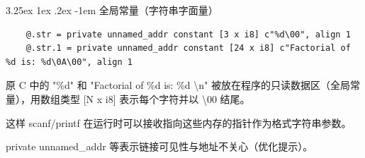 \documentclass[a4paper]{article}
\makeatletter
\renewcommand\paragraph{\@startsection{paragraph}{5}{\z@}%
	{3.25ex \@plus1ex \@minus.2ex}%
	{-1em}%
	{\normalfont\normalsize\bfseries}}
\makeatother
\begin{document}
\paragraph{全局常量（字符串字面量）}
\begin{lstlisting}
	@.str = private unnamed_addr constant [3 x i8] c"%d\00", align 1
	@.str.1 = private unnamed_addr constant [24 x i8] c"Factorial of %d is: %d\0A\00", align 1
\end{lstlisting}
原 C 中的 "\%d" 和 "Factorial of \%d is: \%d \textbackslash n" 被放在程序的只读数据区（全局常量），用数组类型 [N x i8] 表示每个字符并以 \textbackslash00 结尾。

这样 scanf/printf 在运行时可以接收指向这些内存的指针作为格式字符串参数。

private unnamed\_addr 等表示链接可见性与地址不关心（优化提示）。
\end{document}
